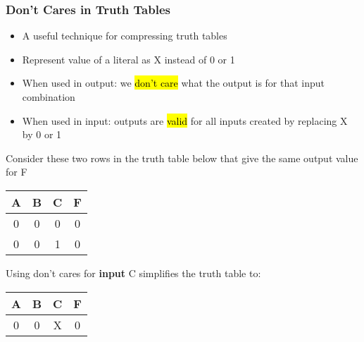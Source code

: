 \begin{frame}\frametitle{Don't Cares in Truth Tables}
\begin{itemize}
	\item A useful technique for compressing
		truth tables  
 \item Represent value of a literal as X instead of 0 or 1
	\item When used in output: we \hl{don't care} what
	the output is for that input combination
	\item When used in input: outputs are \hl{valid} for all
	inputs created by replacing X by 0 or 1 
 \end{itemize}
 \begin{multicols}{2}
Consider these two rows in the truth table below that give the same output value for F
\vspace{4mm}
 {\footnotesize
\begin{center}
    \begin{tabular}{ ccc|c}
    \hline 
    A & B & C & F  \\ \hline
    0 & 0 & 0 & 0  \\
    0 & 0 & 1 & 0  \\
\end{tabular}
\end{center}
}
\columnbreak
Using don't cares for \textbf{input} C simplifies the truth table to:
\vspace{3mm}
{\footnotesize
\begin{center}
    \begin{tabular}{ ccc|c}  
    \hline 
    A & B & C & F  \\ \hline
    0 & 0 & X & 0
\end{tabular}
\end{center}
}
 \end{multicols}


\end{frame}

